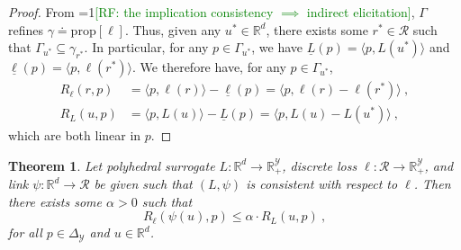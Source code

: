 \documentclass[12pt]{article}
\newcommand{\Comments}{1}
\newcommand{\mynote}[2]{\ifnum\Comments=1\textcolor{#1}{#2}\fi}
\newcommand{\raf}[1]{\mynote{green}{[RF: #1]}}
\newcommand{\reals}{\mathbb{R}}
\newcommand{\defeq}{\doteq}%
\newcommand{\prop}[1]{\mathrm{prop}[#1]}
\newcommand{\simplex}{\Delta_\Y}
\newcommand{\R}{\mathcal{R}}
\newcommand{\Y}{\mathcal{Y}}
\newcommand{\risk}[1]{\underline{#1}}
\newcommand{\inprod}[2]{\langle #1, #2 \rangle}%
\newcommand{\regret}[3]{R_{#1}(#2,#3)}
\newtheorem{theorem}{Theorem}
\begin{document}
\begin{proof}
  From \raf{the implication consistency $\implies$ indirect elicitation}, $\Gamma$ refines $\gamma \defeq \prop{\ell}$.
  Thus, given any $u^*\in\reals^d$, there exists some $r^*\in\R$ such that $\Gamma_{u^*} \subseteq \gamma_{r^*}$.
  In particular, for any $p\in\Gamma_{u^*}$, we have $\risk{L}(p) = \inprod{p}{L(u^*)}$ and $\risk{\ell}(p) = \inprod{p}{\ell(r^*)}$.
  We therefore have, for any $p\in\Gamma_{u^*}$,
  \begin{align*}
    \regret{\ell}{r}{p} &= \inprod{p}{\ell(r)} - \risk{\ell}(p) = \inprod{p}{\ell(r)-\ell(r^*)}~,
    \\
    \regret{L}{u}{p} &= \inprod{p}{L(u)} - \risk{L}(p) = \inprod{p}{L(u)-L(u^*)}~,
  \end{align*}
  which are both linear in $p$.  
\end{proof}

\begin{theorem}\label{thm:regret-bound-poly-consistent}
  Let polyhedral surrogate $L:\reals^d \to \reals^\Y_+$, discrete loss $\ell:\R\to\reals^\Y_+$, and link $\psi:\reals^d\to\R$ be given such that $(L,\psi)$ is consistent with respect to $\ell$.
  Then there exists some $\alpha > 0$ such that
  \begin{equation}
    \label{eq:surrogate-regret-bound}
    \regret{\ell}{\psi(u)}{p}
    \leq
    \alpha \cdot \regret{L}{u}{p}~,
  \end{equation}
  for all $p\in\simplex$ and $u\in\reals^d$.
\end{theorem}
\end{document}
